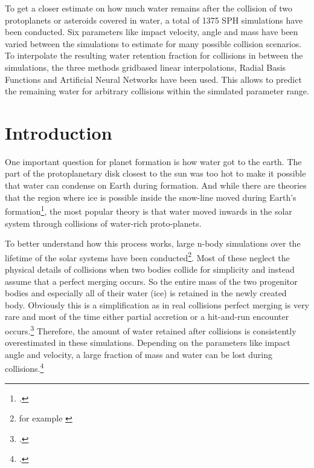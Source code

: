 

To get a closer estimate on how much water remains after the collision of two protoplanets or asteroids covered in water, a total of 1375 SPH simulations have been conducted. Six parameters like impact velocity, angle and mass have been varied between the simulations to estimate for many possible collision scenarios. To interpolate the resulting water retention fraction for collisions in between the simulations, the three methods gridbased linear interpolations, Radial Basis Functions and Artificial Neural Networks have been used. This allows to predict the remaining water for arbitrary collisions within the simulated parameter range.

{\let\clearpage\relax \chapter{Introduction}\label{introduction}}

One important question for planet formation is how water got to the earth. The part of the protoplanetary disk closest to the sun was too hot to make it possible that water can condense on Earth during formation. And while there are theories that the region where ice is possible inside the snow-line moved during Earth's formation\footcite{snowline}, the most popular theory is that water moved inwards in the solar system through collisions of water-rich proto-planets.



To better understand how this process works, large n-body simulations over the lifetime of the solar systems have been conducted\footnote{for example \cite{dvorakSimulation}}. Most of these neglect the physical details of collisions when two bodies collide for simplicity and instead assume that a perfect merging occurs. So the entire mass of the two progenitor bodies and especially all of their water (ice) is retained in the newly created body. Obviously this is a simplification as in real collisions perfect merging is very rare and most of the time either partial accretion or a hit-and-run encounter occurs.\footcite{CollisionTypes} Therefore, the amount of water retained after collisions is consistently overestimated in these simulations. Depending on the parameters like impact angle and velocity, a large fraction of mass and water can be lost during collisions.\footcite{MaindlSummary}

